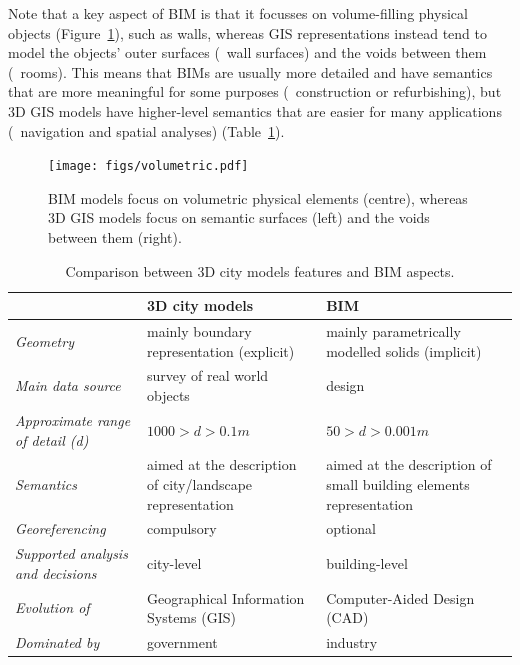 Note that a key aspect of BIM is that it focusses on volume-filling physical objects (Figure~\ref{fig:volumetric}), such as walls, whereas GIS representations instead tend to model the objects' outer surfaces (\eg\ wall surfaces) and the voids between them (\eg\ rooms).
This means that BIMs are usually more detailed and have semantics that are more meaningful for some purposes (\eg\ construction or refurbishing), but 3D GIS models have higher-level semantics that are easier for many applications (\eg\  navigation and spatial analyses) (Table~\ref{tab:vs}).

\begin{figure}
\centering
\texttt{[image: figs/volumetric.pdf]}
\caption{BIM models focus on volumetric physical elements (centre), whereas 3D GIS models focus on semantic surfaces (left) and the voids between them (right).}%
\label{fig:volumetric}
\end{figure}


\begin{table}[H]
	\centering
	\small
	\begin{tabular}{|m{2.5cm}|m{3.5cm}|m{3.5cm}|}
		\hline
		& \textbf{3D city models} & \textbf{BIM}  \\ \hline
		\textit{Geometry} & mainly boundary representation (explicit) & mainly parametrically modelled solids (implicit) \\ \hline
		\textit{Main data source }& survey of real world objects & design \\ \hline
		\textit{Approximate range of detail (d)} & $1000>d>0.1 m$ & $50>d>0.001 m$ \\ \hline
		\textit{Semantics} & aimed at the description of city/landscape representation & aimed at the description of small building elements representation  \\ \hline
		\textit{Georeferencing} & compulsory & optional  \\ \hline
		\textit{Supported analysis and decisions} & city-level & building-level \\ \hline
		\textit{Evolution of} & Geographical Information Systems (GIS) & Computer-Aided Design (CAD) \\ \hline
		\textit{Dominated by} & government & industry \\ \hline
	\end{tabular}
	\caption{Comparison between 3D city models features and BIM aspects.}%
	\label{tab:vs}
\end{table}



